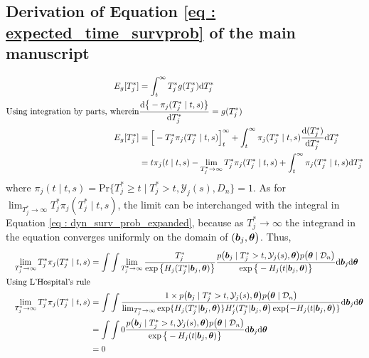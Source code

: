 \subsection{Derivation of Equation \ref{eq : expected_time_survprob} of the main manuscript}
\begin{equation*}
\begin{split}
E_g[T^*_j] &= \int_t^{\infty} T^*_j g(T^*_j)\mathrm{d} T^*_j\\
\text{Using integration by parts, wherein} & \frac{\mathrm{d} \big\{-\pi_j(T^*_j \mid t, s)\big\}}{\mathrm{d} T^*_j} = g(T^*_j)\\
E_g[T^*_j] &= \Big[-T^*_j\pi_j(T^*_j \mid t, s)\Big]_t^\infty + \int_t^{\infty} \pi_j(T^*_j \mid t, s) \frac{\mathrm{d} (T^*_j)}{\mathrm{d} T^*_j} \mathrm{d} T^*_j\\
&= t \pi_j(t \mid t, s) - \lim_{T^*_j\to \infty}T^*_j \pi_j(T^*_j \mid t, s) + \int_t^{\infty} \pi_j(T^*_j \mid t, s) \mathrm{d} T^*_j\\
\end{split}
\end{equation*}
where $\pi_j(t \mid t, s) = \mbox{Pr}\big\{T^*_j \geq t \mid  T^*_j >t, \mathcal{Y}_j(s), D_n\big\} = 1$. As for $\lim_{T^*_j\to \infty}T^*_j \pi_j(T^*_j \mid t, s)$, the limit can be interchanged with the integral in Equation \ref{eq : dyn_surv_prob_expanded}, because as $T^*_j\to \infty$ the integrand in the equation converges uniformly on the domain of $(\boldsymbol{b}_j, \boldsymbol{\theta}\big)$. Thus,
\begin{equation*}
\begin{split}
\lim_{T^*_j\to \infty}T^*_j \pi_j(T^*_j \mid t, s) &=  \int \int \lim_{T^*_j\to \infty} \frac{T^*_j}{\exp\big\{H_j(T^*_j | \boldsymbol{b}_j, \boldsymbol{\theta})\big\}} \frac{p\big(\boldsymbol{b}_j \mid T^*_j>t, \mathcal{Y}_j(s), \boldsymbol{\theta}\big)p\big(\boldsymbol{\theta} \mid \mathcal{D}_n\big)}{\exp\big\{-H_j(t | \boldsymbol{b}_j, \boldsymbol{\theta})\big\}}  \mathrm{d} \boldsymbol{b}_j \mathrm{d} \boldsymbol{\theta}\\
\text{Using L'Hospital's rule}\\
\lim_{T^*_j\to \infty}T^*_j \pi_j(T^*_j \mid t, s) &=  \int \int \frac{1 \times p\big(\boldsymbol{b}_j \mid T^*_j>t, \mathcal{Y}_j(s), \boldsymbol{\theta}\big)p\big(\boldsymbol{\theta} \mid \mathcal{D}_n\big)}{\lim_{T^*_j\to \infty} \exp\{H_j(T^*_j | \boldsymbol{b}_j, \boldsymbol{\theta}\big)\}H'_j(T^*_j | \boldsymbol{b}_j, \boldsymbol{\theta}\big) \exp\{-H_j(t | \boldsymbol{b}_j, \boldsymbol{\theta}\big)\}} \mathrm{d} \boldsymbol{b}_j \mathrm{d} \boldsymbol{\theta}\\
&= \int \int 0 \frac{p\big(\boldsymbol{b}_j \mid T^*_j>t, \mathcal{Y}_j(s), \boldsymbol{\theta}\big)p\big(\boldsymbol{\theta} \mid \mathcal{D}_n\big)}{\exp\big\{-H_j(t | \boldsymbol{b}_j, \boldsymbol{\theta})\big\}}  \mathrm{d} \boldsymbol{b}_j \mathrm{d} \boldsymbol{\theta}\\
&= 0
\end{split}
\end{equation*}

